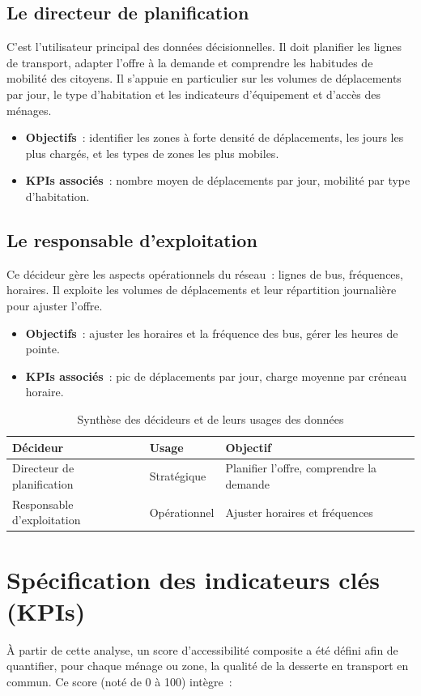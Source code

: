 \subsection{Le directeur de planification}
C'est l'utilisateur principal des données décisionnelles. Il doit planifier les lignes de transport, adapter l'offre à la demande et comprendre les habitudes de mobilité des citoyens. Il s'appuie en particulier sur les volumes de déplacements par jour, le type d'habitation et les indicateurs d'équipement et d'accès des ménages.
\begin{itemize}
\item \textbf{Objectifs}~: identifier les zones à forte densité de déplacements, les jours les plus chargés, et les types de zones les plus mobiles.
\item \textbf{KPIs associés}~: nombre moyen de déplacements par jour, mobilité par type d'habitation.
\end{itemize}

\subsection{Le responsable d'exploitation}
Ce décideur gère les aspects opérationnels du réseau~: lignes de bus, fréquences, horaires. Il exploite les volumes de déplacements et leur répartition journalière pour ajuster l'offre.
\begin{itemize}
\item \textbf{Objectifs}~: ajuster les horaires et la fréquence des bus, gérer les heures de pointe.
\item \textbf{KPIs associés}~: pic de déplacements par jour, charge moyenne par créneau horaire.
\end{itemize}

\begin{table}[H]
\centering
\caption{Synthèse des décideurs et de leurs usages des données}
\begin{tabular}{p{3.2cm}p{4.5cm}p{5.5cm}}
\toprule
\textbf{Décideur} & \textbf{Usage} & \textbf{Objectif} \\
\midrule
Directeur de planification & Stratégique & Planifier l'offre, comprendre la demande \\
Responsable d'exploitation & Opérationnel & Ajuster horaires et fréquences \\
\bottomrule
\end{tabular}
\end{table}

\section{Spécification des indicateurs clés (KPIs)}
À partir de cette analyse, un score d'accessibilité composite a été défini afin de quantifier, pour chaque ménage ou zone, la qualité de la desserte en transport en commun. Ce score (noté de 0 à 100) intègre~:


